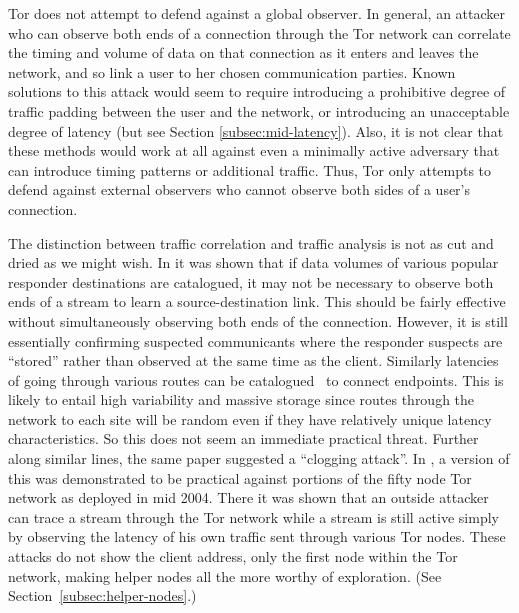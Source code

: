 \documentclass{llncs}
\begin{document}
Tor does not attempt to defend against a global observer.  In general, an
attacker who can observe both ends of a connection through the Tor network
can correlate the timing and volume of data on that connection as it enters
and leaves the network, and so link a user to her chosen communication
parties.  Known solutions to this attack would seem to require introducing a
prohibitive degree of traffic padding between the user and the network, or
introducing an unacceptable degree of latency (but see Section
\ref{subsec:mid-latency}).  Also, it is not clear that these methods would
work at all against even a minimally active adversary that can introduce timing
patterns or additional traffic.  Thus, Tor only attempts to defend against
external observers who cannot observe both sides of a user's connection.

The distinction between traffic correlation and traffic analysis is
not as cut and dried as we might wish. In \cite{hintz-pet02} it was
shown that if data volumes of various popular
responder destinations are catalogued, it may not be necessary to
observe both ends of a stream to learn a source-destination link.
This should be fairly effective without simultaneously observing both
ends of the connection. However, it is still essentially confirming
suspected communicants where the responder suspects are ``stored'' rather
than observed at the same time as the client.
Similarly latencies of going through various routes can be
catalogued~\cite{back01} to connect endpoints.
This is likely to entail high variability and massive storage since
%
routes through the network to each site will be random even if they
have relatively unique latency characteristics. So this does not seem
an immediate practical threat. Further along similar lines, the same
paper suggested a ``clogging attack''. In \cite{attack-tor-oak05}, a
version of this was demonstrated to be practical against portions of
the fifty node Tor network as deployed in mid 2004. There it was shown
that an outside attacker can trace a stream through the Tor network
while a stream is still active simply by observing the latency of his
own traffic sent through various Tor nodes. These attacks do not show
the client address, only the first node within the Tor network, making
helper nodes all the more worthy of exploration. (See
Section~\ref{subsec:helper-nodes}.)
\end{document}
